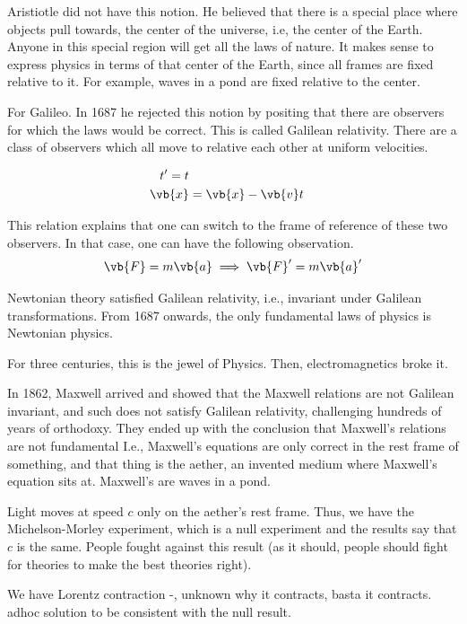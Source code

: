 		Aristiotle did not have this notion. He believed that there is a special place where objects pull towards, the center of the universe, i.e,
		the center of the Earth. Anyone in this special region will get all the laws of nature. It makes sense to express physics in terms of that
		center of the Earth, since all frames are fixed relative to it.
		For example, waves in a pond are fixed relative to the center.

		For Galileo. In 1687 he rejected this notion by positing that there are observers for which the laws would be correct.
		This is called Galilean relativity. There are a class of observers which all move to relative each other at uniform velocities.

		\begin{align}
		 t' = t\\
		 \vb{x} &= \vb{x} - \vb{v}t
		\end{align}

		This relation explains that one can switch to the frame of reference of these two observers.
		In that case, one can have the following observation.
		\begin{equation}
			\vb{F} = m\vb{a} \implies \vb{F}' = m \vb{a}'
		\end{equation}

		Newtonian theory satisfied Galilean relativity, i.e., invariant under Galilean transformations.
		From 1687 onwards, the only fundamental laws of physics is Newtonian physics.

		For three centuries, this is the jewel of Physics. Then, electromagnetics broke it.

		In 1862, Maxwell arrived and showed that the Maxwell relations are not Galilean invariant, and such
		does not satisfy Galilean relativity, challenging hundreds of years of orthodoxy.
		They ended up with the conclusion that Maxwell's relations are not fundamental
		I.e., Maxwell's equations are only correct in the rest frame of something, and that thing is the aether,
		an invented medium where Maxwell's equation sits at. Maxwell's are waves in a pond.

		Light moves at speed $c$ only on the aether's rest frame. Thus, we have the Michelson-Morley experiment, which
		is a null experiment and the results say that $c$ is the same.
		People fought against this result (as it should, people should fight for theories to make the best
		theories right).

		We have Lorentz contraction -, unknown why it contracts, basta it contracts. adhoc solution to be consistent with the null result.

